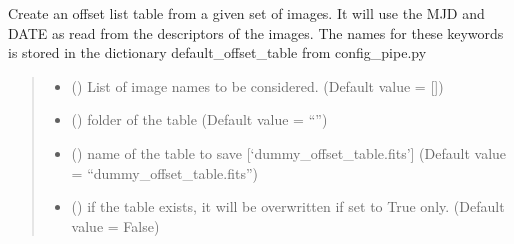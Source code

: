 \documentclass[letterpaper,10pt,english]{sphinxmanual}
\begin{document}
\begin{fulllineitems}
\label{\detokenize{api/pymusepipe:pymusepipe.util_image.create_offset_table}}
\pysigstartsignatures
{}
\pysigstopsignatures
\sphinxAtStartPar
Create an offset list table from a given set of images. It will use
the MJD and DATE as read from the descriptors of the images. The names for
these keywords is stored in the dictionary default\_offset\_table from
config\_pipe.py
\begin{quote}\begin{description}
\begin{itemize}
\item {} 
\sphinxAtStartPar
{} () \textendash{} List of image names to be considered. (Default value = {[}{]})

\item {} 
\sphinxAtStartPar
{} () \textendash{} folder of the table (Default value = “”)

\item {} 
\sphinxAtStartPar
{} () \textendash{} name of the table to save {[}‘dummy\_offset\_table.fits’{]}
(Default value = “dummy\_offset\_table.fits”)

\item {} 
\sphinxAtStartPar
{} () \textendash{} if the table exists, it will be overwritten if set
to True only. (Default value = False)


\end{itemize}
\end{description}
\end{quote}
\end{fulllineitems}
\end{document}
